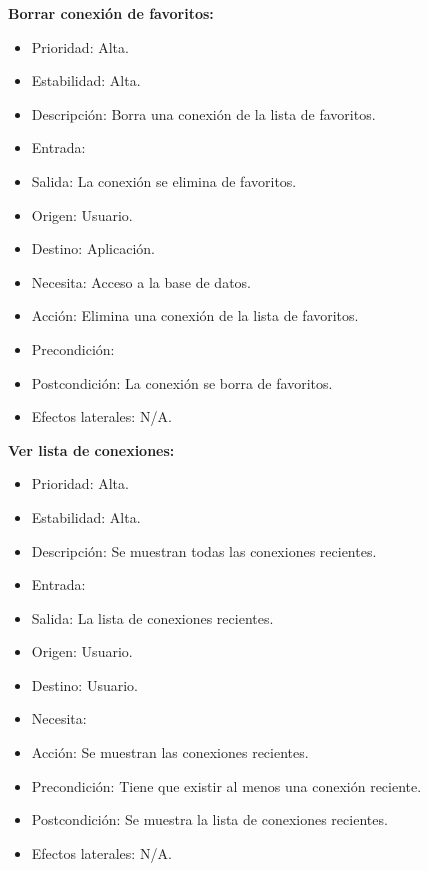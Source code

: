 \textbf{Borrar conexión de favoritos:}
\begin{itemize}
\item Prioridad: Alta.
\item Estabilidad: Alta.
\item Descripción: Borra una conexión de la lista de favoritos.
\item Entrada:
\item Salida: La conexión se elimina de favoritos.
\item Origen: Usuario.
\item Destino: Aplicación.
\item Necesita: Acceso a la base de datos.
\item Acción: Elimina una conexión de la lista de favoritos.
\item Precondición:
\item Postcondición: La conexión se borra de favoritos.
\item Efectos laterales: N/A.\\

\end{itemize}
\newpage
\textbf{Ver lista de conexiones:}
\begin{itemize}
\item Prioridad: Alta.
\item Estabilidad: Alta.
\item Descripción: Se muestran todas las conexiones recientes.
\item Entrada:
\item Salida: La lista de conexiones recientes.
\item Origen: Usuario.
\item Destino: Usuario.
\item Necesita:
\item Acción: Se muestran las conexiones recientes.
\item Precondición: Tiene que existir al menos una conexión reciente.
\item Postcondición: Se muestra la lista de conexiones recientes.
\item Efectos laterales: N/A.\\

\end{itemize}


